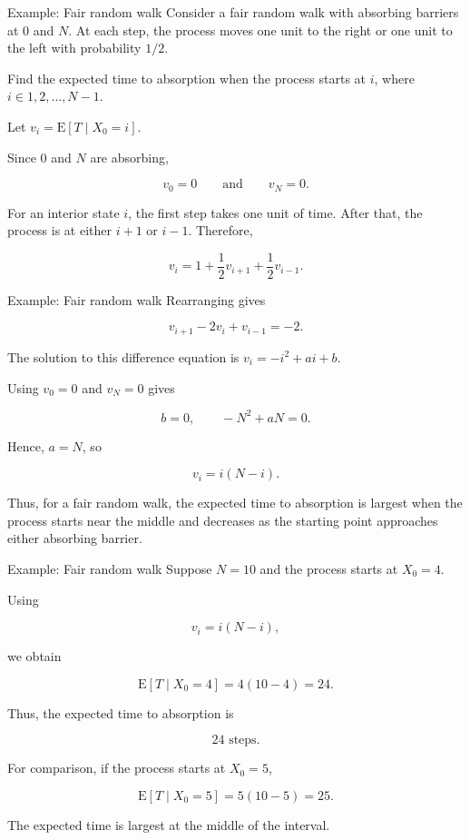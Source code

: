 \documentclass[
  ignorenonframetext,
  aspectratio=169,
]{beamer}
\begin{document}
\begin{frame}{Example: Fair random walk}
\protect{}\label{example-fair-random-walk-1}
Consider a fair random walk with absorbing barriers at \(0\) and \(N\).
At each step, the process moves one unit to the right or one unit to the
left with probability \(1/2\).

Find the expected time to absorption when the process starts at \(i\),
where \(i\in{1,2,\ldots,N-1}\).

Let \(v_i=\mathrm{E}[T\mid X_0=i].\)

Since \(0\) and \(N\) are absorbing,

\[
v_0=0
\qquad\text{and}\qquad
v_N=0.
\]

For an interior state \(i\), the first step takes one unit of time.
After that, the process is at either \(i+1\) or \(i-1\). Therefore,

\[
v_i=1+\frac12v_{i+1}+\frac12v_{i-1}.
\]
\end{frame}

\begin{frame}{Example: Fair random walk}
\protect{}\label{example-fair-random-walk-2}
Rearranging gives

\[
v_{i+1}-2v_i+v_{i-1}=-2.
\]

The solution to this difference equation is \(v_i=-i^2+ai+b\).

Using \(v_0=0\) and \(v_N=0\) gives

\[
b=0,
\qquad
-N^2+aN=0.
\]

Hence, \(a=N\), so

\[
\boxed{v_i=i(N-i)}.
\]

Thus, for a fair random walk, the expected time to absorption is largest
when the process starts near the middle and decreases as the starting
point approaches either absorbing barrier.
\end{frame}

\begin{frame}{Example: Fair random walk}
\protect{}\label{example-fair-random-walk-3}
Suppose \(N=10\) and the process starts at \(X_0=4\).

Using

\[
v_i=i(N-i),
\]

we obtain

\[
\mathrm{E}[T\mid X_0=4]
=
4(10-4)
=
24.
\]

Thus, the expected time to absorption is

\[
\boxed{24\text{ steps}}.
\]

For comparison, if the process starts at \(X_0=5\),

\[
\mathrm{E}[T\mid X_0=5]=5(10-5)=25.
\]

The expected time is largest at the middle of the interval.
\end{frame}
\end{document}
